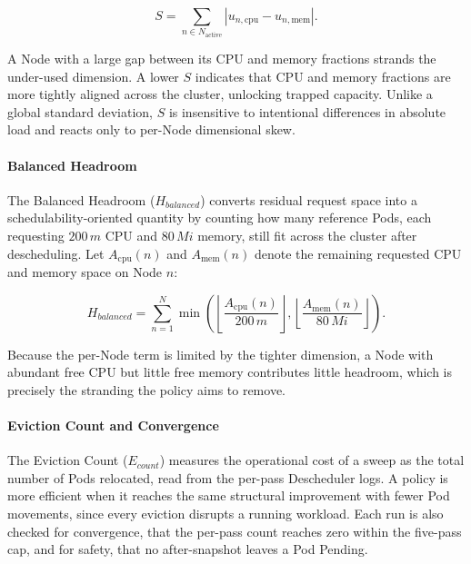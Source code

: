 \[
    S = \sum_{n \in N_{\text{active}}} \left|u_{n,\text{cpu}} - u_{n,\text{mem}}\right|.
\]

A Node with a large gap between its CPU and memory fractions strands the under-used dimension. A lower \(S\) indicates that CPU and memory fractions are more tightly aligned across the cluster, unlocking trapped capacity. Unlike a global standard deviation, \(S\) is insensitive to intentional differences in absolute load and reacts only to per-Node dimensional skew.

\paragraph{Balanced Headroom}
The Balanced Headroom (\(H_{balanced}\)) converts residual request space into a schedulability-oriented quantity by counting how many reference Pods, each requesting \(200\,m\) CPU and \(80\,Mi\) memory, still fit across the cluster after descheduling. Let \(A_{\text{cpu}}(n)\) and \(A_{\text{mem}}(n)\) denote the remaining requested CPU and memory space on Node \(n\):

\[
H_{balanced}
=
\sum_{n=1}^{N}
\min\!\left(
\left\lfloor
\frac{A_{\text{cpu}}(n)}{200\,m}
\right\rfloor,
\left\lfloor
\frac{A_{\text{mem}}(n)}{80\,Mi}
\right\rfloor
\right).
\]

Because the per-Node term is limited by the tighter dimension, a Node with abundant free CPU but little free memory contributes little headroom, which is precisely the stranding the policy aims to remove.

\paragraph{Eviction Count and Convergence}
The Eviction Count (\(E_{count}\)) measures the operational cost of a sweep as the total number of Pods relocated, read from the per-pass Descheduler logs. A policy is more efficient when it reaches the same structural improvement with fewer Pod movements, since every eviction disrupts a running workload. Each run is also checked for convergence, that the per-pass count reaches zero within the five-pass cap, and for safety, that no after-snapshot leaves a Pod Pending.

